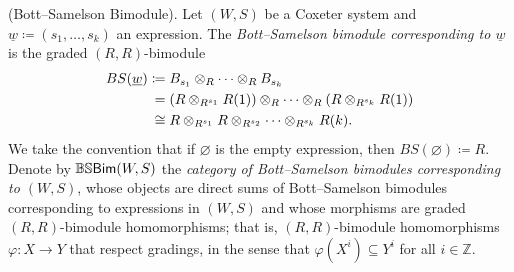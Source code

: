 \noindent\begin{definition}\textup{(Bott--Samelson Bimodule).} Let $(W, S)$ be a Coxeter system and $\underline{w} \coloneqq (s_1, \dots, s_k)$ an expression. The {\em Bott--Samelson bimodule corresponding to $\underline{w}$} is the graded $(R, R)$-bimodule
\begin{align*}
\begin{split}
BS(\underline{w}) &\coloneqq B_{s_1} \otimes_R \cdots \otimes_R B_{s_k}\\
&\hphantom{\coloneqq}\nhphantom{=}= (R \otimes_{R^{s_1}} R(1)) \otimes_R \cdots \otimes_R (R \otimes_{R^{s_k}} R(1))\\
&\hphantom{\coloneqq}\nhphantom{$\cong$}\cong R \otimes_{R^{s_1}} R \otimes_{R^{s_2}} \cdots \otimes_{R^{s_k}} R(k).
\end{split}
\end{align*}
\noindent We take the convention that if $\varnothing$ is the empty expression, then $BS(\varnothing) \coloneqq R$. Denote by $\mathbb{BS}\textup{\textsf{Bim}}(W, S)$ the {\em category of Bott--Samelson bimodules corresponding to $(W, S)$}, whose objects are direct sums of Bott--Samelson bimodules corresponding to expressions in $(W, S)$ and whose morphisms are graded $(R, R)$-bimodule homomorphisms; that is, $(R, R)$-bimodule homomorphisms $\varphi : X \to Y$ that respect gradings, in the sense that $\varphi(X^i) \subseteq Y^i$ for all $i \in \mathbb{Z}$.\\
\end{definition}

